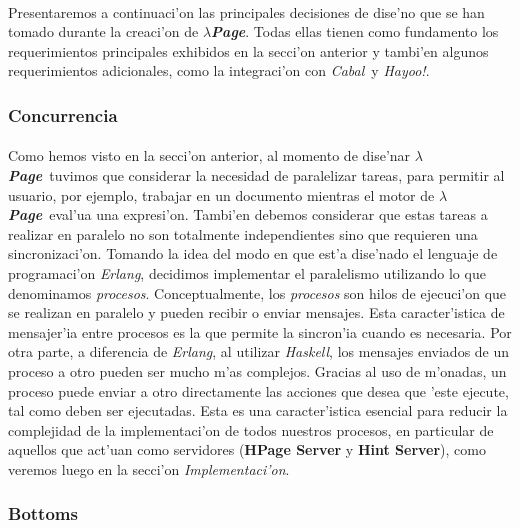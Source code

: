 \documentclass[a4paper]{article}
\newcommand{\haskell}{\textsl{Haskell}}
\newcommand{\hpage}{\textbf{\textsl{$\lambda$Page}}}
\newcommand{\cabal}{\textsl{Cabal}}
\begin{document}
\paragraph{}Presentaremos a continuaci'on las principales decisiones de dise'no que se han tomado durante la creaci'on de \hpage.  Todas ellas tienen como fundamento los requerimientos principales exhibidos en la secci'on anterior y tambi'en algunos requerimientos adicionales, como la integraci'on con \cabal\ y \textsl{Hayoo!}.
\subsubsection{Concurrencia}
\paragraph{}Como hemos visto en la secci'on anterior, al momento de dise'nar \hpage\ tuvimos que considerar la necesidad de paralelizar tareas, para permitir al usuario, por ejemplo, trabajar en un documento mientras el motor de \hpage\ eval'ua una expresi'on.  Tambi'en debemos considerar que estas tareas a realizar en paralelo no son totalmente independientes sino que requieren una sincronizaci'on.  Tomando la idea del modo en que est'a dise'nado el lenguaje de programaci'on \textsl{Erlang}, decidimos implementar el paralelismo utilizando lo que denominamos \textsl{procesos}.  Conceptualmente, los \textsl{procesos} son hilos de ejecuci'on que se realizan en paralelo y pueden recibir o enviar mensajes.   Esta caracter'istica de mensajer'ia entre procesos es la que permite la sincron'ia cuando es necesaria.  Por otra parte, a diferencia de \textsl{Erlang}, al utilizar \haskell, los mensajes enviados de un proceso a otro pueden ser mucho m'as complejos.  Gracias al uso de m'onadas, un proceso puede enviar a otro directamente las acciones que desea que 'este ejecute, tal como deben ser ejecutadas.  Esta es una caracter'istica esencial para reducir la complejidad de la implementaci'on de todos nuestros procesos, en particular de aquellos que act'uan como servidores (\textbf{HPage Server} y \textbf{Hint Server}), como veremos luego en la secci'on \textsl{Implementaci'on}.
\subsubsection{Bottoms}
\end{document}
